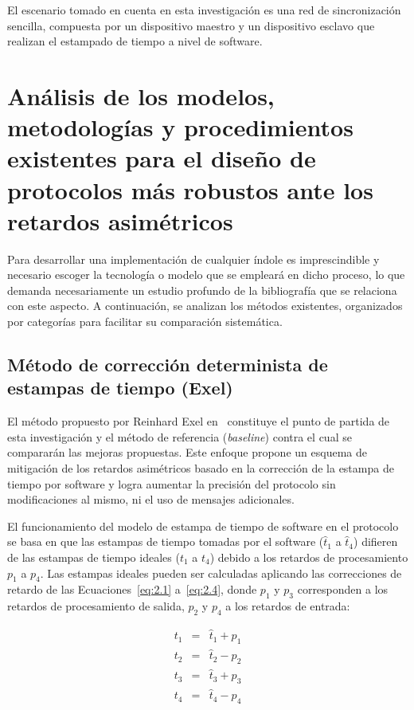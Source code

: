 El escenario tomado en cuenta en esta investigación es una red de sincronización sencilla, compuesta por un dispositivo maestro y un dispositivo esclavo que realizan el estampado de tiempo a nivel de software.

\section{Análisis de los modelos, metodologías y procedimientos existentes para el diseño de protocolos más robustos ante los retardos asimétricos}
\label{sec:2.2}

Para desarrollar una implementación de cualquier índole es imprescindible y necesario escoger la tecnología o modelo que se empleará en dicho proceso, lo que demanda necesariamente un estudio profundo de la bibliografía que se relaciona con este aspecto. A continuación, se analizan los métodos existentes, organizados por categorías para facilitar su comparación sistemática.

\subsection{Método de corrección determinista de estampas de tiempo (Exel)}
\label{sec:2.2.1}

El método propuesto por Reinhard Exel en~\cite{exel2014} constituye el punto de partida de esta investigación y el método de referencia (\textit{baseline}) contra el cual se compararán las mejoras propuestas. Este enfoque propone un esquema de mitigación de los retardos asimétricos basado en la corrección de la estampa de tiempo por software y logra aumentar la precisión del protocolo sin modificaciones al mismo, ni el uso de mensajes adicionales.

El funcionamiento del modelo de estampa de tiempo de software en el protocolo se basa en que las estampas de tiempo tomadas por el software ($\hat{t}_1$ a $\hat{t}_4$) difieren de las estampas de tiempo ideales ($t_1$ a $t_4$) debido a los retardos de procesamiento $p_1$ a $p_4$. Las estampas ideales pueden ser calculadas aplicando las correcciones de retardo de las Ecuaciones~\ref{eq:2.1} a~\ref{eq:2.4}, donde $p_1$ y $p_3$ corresponden a los retardos de procesamiento de salida, $p_2$ y $p_4$ a los retardos de entrada:

\begin{eqnarray}
t_1 &=& \hat{t}_1 + p_1 \label{eq:2.1}\\
t_2 &=& \hat{t}_2 - p_2 \label{eq:2.2}\\
t_3 &=& \hat{t}_3 + p_3 \label{eq:2.3}\\
t_4 &=& \hat{t}_4 - p_4 \label{eq:2.4}
\end{eqnarray}

